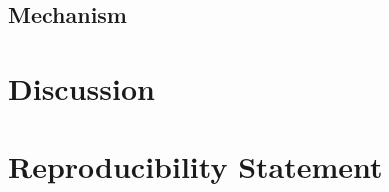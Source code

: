 \documentclass{article}
\begin{document}
\subsection{Mechanism}

\section{Discussion}

\section{Reproducibility Statement}



\end{document}
